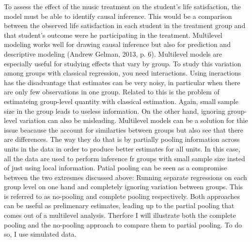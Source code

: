 \documentclass[a4, 12pt]{article}
\begin{document}
\label{sec:identification}
To assess the effect of the music treatment on the student's life satisfaction, the model must be able to identify causal inference. This would be a comparison between the observed life satisfaction in each student in the treatment group and that student's outcome were he participating in the treatment. Multilevel modeling works well for drawing causal inference but also for prediction and descriptive modeling (Andrew Gelman, 2013, p. 6). Multilevel models are especially useful for studying effects that vary by group. To study this variation among groups with classical regression, you need interactions. Using ineractions has the disadvantage that estimates can be very noisy, in particular when there are only few observations in one group. Related to this is the problem of estimateing group-level quantity with classical estimation. Again, small sample size in the group leads to useless information. On the other hand, ignoring group-level variation can also be misleading. Multilevel models can be a solution for thie issue beacause the account for similarties between groups but also see that there are differences. The way they do that is by partially pooling information across units in the data in order to produce better estimates for all units. In this case, all the data are used to perform inference fr groups with small sample size insted of just using local information. Patial pooling can be seen as a compromise between the two extresmes discussed above: Running separate regressions on each group level on one hand and completely ignoring variation between groups. This is referred to as no-pooling and complete pooling respectively. Both approaches can be useful as prelimenary estimates, leading up to the partial pooling that comes out of a multilevel analysis. Therfore I will illustrate both the complete pooling and the no-pooling approach to compare them to partial pooling. To do so, I use simulated data.
\end{document}
